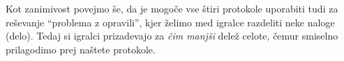 \documentclass[a4paper,12pt]{article}
\begin{document}
 Kot zanimivost povejmo še, da je mogoče vse štiri protokole uporabiti tudi za reševanje ``problema z opravili'', kjer želimo med igralce razdeliti neke naloge (delo). Tedaj si igralci prizadevajo za {\em čim manjši} delež celote, čemur smiselno prilagodimo prej naštete protokole.


\end{document}
